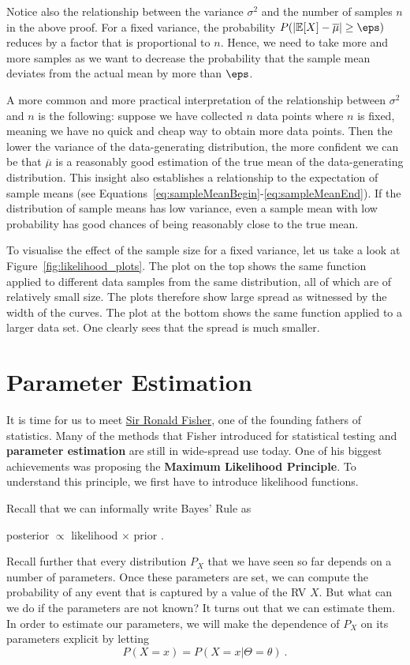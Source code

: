 Notice also the relationship between the variance $ \sigma^{2} $ and the number of samples $ n $ in the above proof. For a fixed variance, the
probability $ P(|\mathbb{E}[X] - \overline{\mu}| \geq \eps) $ reduces by a factor that is proportional to $ n $. Hence, we need to take
more and more samples as we want to decrease the probability that the sample mean deviates from the actual mean by more than $ \eps $. 

A more common and more practical interpretation of the relationship between $ \sigma^{2} $ and $ n $ is the following: suppose we have collected $ n $ data
points where $ n $ is fixed, meaning we have no quick and cheap way to obtain more data points. Then the lower the variance of the data-generating distribution, 
the more confident we can be
that $ \overline{\mu} $ is a reasonably good estimation of the true mean of the data-generating distribution. This insight also establishes a relationship to
the expectation of sample means (see Equations~\eqref{eq:sampleMeanBegin}-\eqref{eq:sampleMeanEnd}). If the distribution of sample means has low variance, even 
a sample mean with low probability has good chances of being reasonably close to the true mean.

To visualise the effect of the sample size for a fixed variance, 
let us take a look at Figure~\ref{fig:likelihood_plots}. The plot on the top shows the same function applied
to different data samples from the same distribution, all of which are of relatively small size. 
The plots therefore show large spread as witnessed by the width of the curves. The 
plot at the bottom shows the same function applied to a larger data set. One clearly sees that the spread is much smaller.

\section{Parameter Estimation}\label{parameterEstimation}

It is time for us to meet \href{https://en.wikipedia.org/wiki/Ronald_Fisher}{Sir Ronald Fisher}, 
one of the founding fathers of statistics. Many of the methods that Fisher introduced
for statistical testing and \textbf{parameter estimation} are still in wide-spread use today. One of his biggest achievements was proposing the 
\textbf{Maximum Likelihood Principle}. To understand this principle, we first have to introduce likelihood functions.

Recall that we can informally write Bayes' Rule as 
\begin{center}
posterior $ \propto $ likelihood $ \times $ prior .
\end{center}
Recall further that every distribution $ P_{X} $ that we have seen so far depends on a number of parameters. 
Once these parameters are set, we can compute the probability of 
any event that is  captured by a value of the RV $ X $. But what can we do if the parameters are not known? It turns out that we can estimate them. In order to 
estimate our parameters, we will make the dependence of $ P_{X} $ on its parameters explicit by letting
\begin{equation}
P(X=x) = P(X=x|\Theta = \theta) \ . 
\end{equation}

